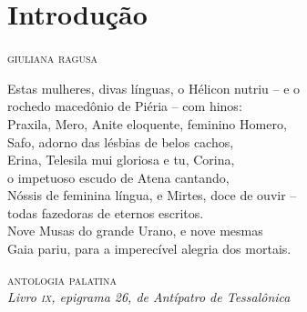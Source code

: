 \chapter*{Introdução }



\begin{flushright}
\textsc{giuliana ragusa}
\end{flushright}


{\setlength{\epigraphwidth}{.7\textwidth}
\epigraph{Estas mulheres, divas línguas, o Hélicon nutriu -- e o  \\
rochedo macedônio de Piéria -- com hinos: \\
Praxila, Mero, Anite eloquente, feminino Homero, \\
Safo, adorno das lésbias de belos cachos, \\
Erina, Telesila mui gloriosa e tu, Corina, \\
o impetuoso escudo de Atena cantando, \\
Nóssis de feminina língua, e Mirtes, doce de ouvir --  \\
todas fazedoras de eternos escritos. \\
Nove Musas do grande Urano, e nove mesmas \\
Gaia pariu, para a imperecível alegria dos mortais.}
{\textsc{antologia palatina}\footnotemark{}\\\textit{Livro \textsc{ix}, epigrama 26, de Antípatro de Tessalônica}\footnotemark{}}
\addtocounter{footnote}{-2}
}

